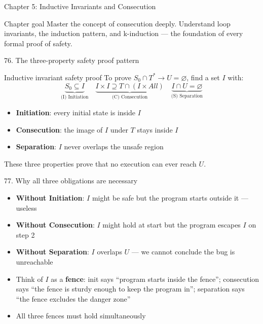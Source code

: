 \documentclass[aspectratio=169]{beamer}
\begin{document}
\begin{frame}{Chapter 5: Inductive Invariants and Consecution}
\begin{block}{Chapter goal}
Master the concept of consecution deeply. Understand loop invariants, the induction pattern,
and k-induction --- the foundation of every formal proof of safety.
\end{block}
\end{frame}

\begin{frame}{76. The three-property safety proof pattern}
\begin{block}{Inductive invariant safety proof}
To prove \(S_0 \cap T^* \to U = \varnothing\), find a set \(I\) with:
\[
\underbrace{S_0 \subseteq I}_{\text{(I) Initiation}}
\quad
\underbrace{I \times I \supseteq T \cap (I \times \mathit{All})}_{\text{(C) Consecution}}
\quad
\underbrace{I \cap U = \varnothing}_{\text{(S) Separation}}
\]
\end{block}
\begin{itemize}
  \item \textbf{Initiation}: every initial state is inside \(I\)
  \item \textbf{Consecution}: the image of \(I\) under \(T\) stays inside \(I\)
  \item \textbf{Separation}: \(I\) never overlaps the unsafe region
\end{itemize}
These three properties prove that no execution can ever reach \(U\).
\end{frame}

\begin{frame}{77. Why all three obligations are necessary}
\begin{itemize}
  \item \textbf{Without Initiation}: \(I\) might be safe but the program starts outside it --- useless
  \item \textbf{Without Consecution}: \(I\) might hold at start but the program escapes \(I\) on step 2
  \item \textbf{Without Separation}: \(I\) overlaps \(U\) --- we cannot conclude the bug is unreachable
  \item Think of \(I\) as a \textbf{fence}: init says ``program starts inside the fence''; consecution says
    ``the fence is sturdy enough to keep the program in''; separation says ``the fence excludes the danger zone''
  \item All three fences must hold simultaneously
\end{itemize}
\end{frame}
\end{document}
